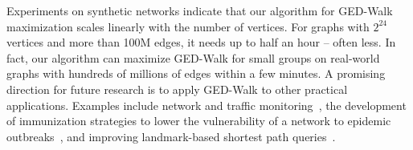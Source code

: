 Experiments on synthetic networks indicate that our algorithm for GED-Walk
maximization scales linearly with the number of vertices.
For graphs with $2^{24}$ vertices and more than 100M edges, it needs up to
half an hour -- often less. In fact, our algorithm can maximize GED-Walk for
small groups on real-world graphs with hundreds of millions of edges within a
few minutes.
A promising direction for future research is to apply GED-Walk to other
practical applications. Examples include network and traffic
monitoring~\cite{DBLP:journals/ipl/DolevEPZ09,DBLP:journals/jits/PuzisAEBSP13},
the development of immunization strategies to lower the vulnerability of a
network to epidemic outbreaks~\cite{pastor2002immunization}, and improving
landmark-based shortest path queries~\cite{DBLP:conf/soda/GoldbergH05}.
